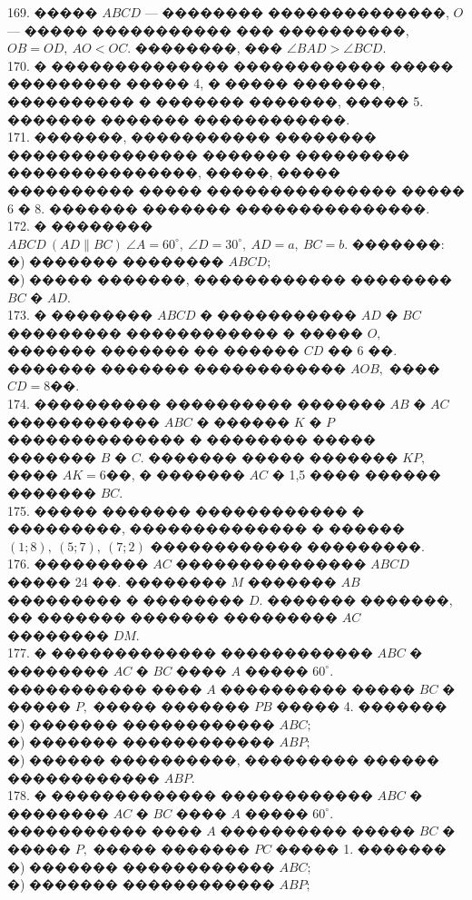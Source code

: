 \documentclass[12pt]{article}
\begin{document}
169. ����� $ABCD$ --- �������� ��������������, $O$ --- ����� ����������� ��� ����������, $OB=OD,\ AO<OC.$ ��������, ��� $\angle BAD > \angle BCD.$\\
170. � �������������� ������������ ����� ��������� ����� 4, � ����� �������, ���������� � ������� �������, ����� 5. ������� ������� ������������.\\
171. �������, ����������� �������� ��������������� ������� ��������� ���������������, �����, ����� ���������� ����� ��������������� ����� 6 � 8. ������� ������� ���������������.\\
172. � �������� $ABCD\ (AD\parallel BC)\ \angle A=60^\circ,\ \angle D=30^\circ,\ AD=a,\ BC=b.$ �������:\\
�) ������� �������� $ABCD;$\\
�) ����� �������, ������������ �������� $BC$ � $AD.$\\
173. � �������� $ABCD$ � ����������� $AD$ � $BC$ ��������� ������������ � ����� $O,$ ������� ������� �� ������ $CD$ �� 6 ��. ������� ������� ������������ $AOB,$ ���� $CD=8$��.\\
174. ���������� ���������� ������� $AB$ � $AC$ ������������ $ABC$ � ������ $K$ � $P$ �������������� � �������� ����� ������� $B$ � $C.$ ������� ����� ������� $KP,$ ���� $AK=6$��, � ������� $AC$ � 1,5 ���� ������ ������� $BC.$\\
175. ����� ������� ������������ � ���������, �������������� � ������ $(1;8),\ (5;7),\ (7;2)$ ������������ ���������.\\
176. ��������� $AC$ ��������������� $ABCD$ ����� 24 ��. �������� $M$ ������� $AB$ ��������� � �������� $D.$ ������� �������, �� ������� ������� ��������� $AC$ �������� $DM.$\\
177. � ������������� ������������ $ABC$ � �������� $AC$ � $BC$ ���� $A$ ����� $60^\circ.$ ����������� ���� $A$ ���������� ����� $BC$ � ����� $P,$ ����� ������� $PB$ ����� 4. �������\\
�) ������� ������������ $ABC;$\\
�) ������� ������������ $ABP;$\\
�) ������ ����������, ��������� ������ ������������ $ABP.$\\
178. � ������������� ������������ $ABC$ � �������� $AC$ � $BC$ ���� $A$ ����� $60^\circ.$ ����������� ���� $A$ ���������� ����� $BC$ � ����� $P,$ ����� ������� $PC$ ����� 1. �������\\
�) ������� ������������ $ABC;$\\
�) ������� ������������ $ABP;$\\
\end{document}
